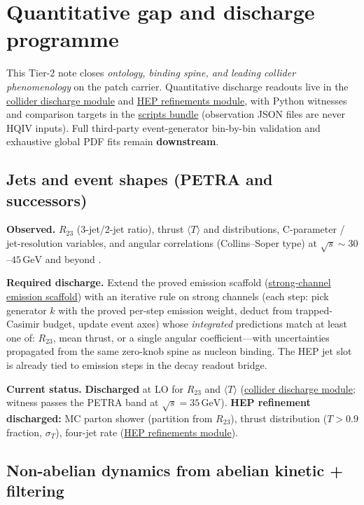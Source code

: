 \documentclass[11pt]{amsart}
\begin{document}
\section{Quantitative gap and discharge programme}
\label{sec:quantitative-gap}

This Tier-2 note closes \emph{ontology, binding spine, and leading collider
phenomenology} on the patch carrier.  Quantitative discharge readouts live in the
\hyperref[lean:collider-discharge]{collider discharge module} and
\hyperref[lean:hep-refinements]{HEP refinements module}, with Python witnesses and
comparison targets in the \hyperref[lean:scripts-bundle]{scripts bundle} (observation
JSON files are never HQIV inputs). Full third-party event-generator bin-by-bin
validation and exhaustive global PDF fits remain \textbf{downstream}.

\subsection{Jets and event shapes (PETRA and successors)}

\textbf{Observed.} $R_{23}$ (3-jet/2-jet ratio), thrust $\langle T\rangle$ and
distributions, C-parameter / jet-resolution variables, and angular correlations
(Collins--Soper type) at $\sqrt{s}\sim 30$--$45\,\mathrm{GeV}$ and beyond
\cite{bartel1979,berger1979,peskin1995,pdg2024}.

\textbf{Required discharge.} Extend the proved emission scaffold
(\hyperref[lean:emission-scaffold]{strong-channel emission scaffold}) with an
iterative rule on strong channels (each step: pick generator $k$ with the proved
per-step emission weight, deduct from trapped-Casimir budget, update event axes)
whose \emph{integrated} predictions match at least one of: $R_{23}$, mean thrust, or
a single angular coefficient---with uncertainties propagated from the same zero-knob
spine as nucleon binding. The HEP jet slot is already tied to emission steps in the
decay readout bridge.

\textbf{Current status.} \textbf{Discharged} at LO for $R_{23}$ and $\langle T\rangle$
(\hyperref[lean:collider-discharge]{collider discharge module}; witness passes the
PETRA band \cite{bartel1979,berger1979,pdg2024} at
$\sqrt{s}=35\,\mathrm{GeV}$).  \textbf{HEP refinement discharged:} MC parton shower
(partition from $R_{23}$), thrust distribution ($T>0.9$ fraction, $\sigma_T$), four-jet
rate (\hyperref[lean:hep-refinements]{HEP refinements module}).

\subsection{Non-abelian dynamics from abelian kinetic + filtering}
\end{document}
